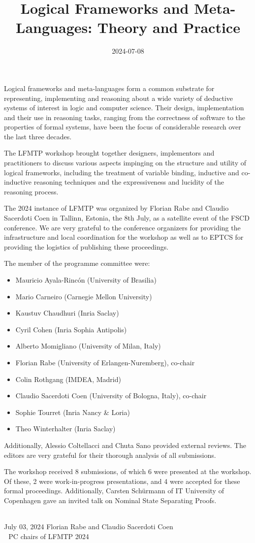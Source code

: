 \documentclass{article}
\begin{document}
\title{Logical Frameworks and Meta-Languages: Theory and Practice}
\date{2024-07-08}
\maketitle

Logical frameworks and meta-languages form a common substrate for
representing, implementing and reasoning about a wide variety of
deductive systems of interest in logic and computer science. Their
design, implementation and their use in reasoning tasks, ranging from
the correctness of software to the properties of formal systems,
have been the focus of considerable research over the last three decades.

The LFMTP workshop brought together designers, implementors and
practitioners to discuss various aspects impinging on the structure and
utility of logical frameworks, including the treatment of variable
binding, inductive and co-inductive reasoning techniques and the
expressiveness and lucidity of the reasoning process.

The 2024 instance of LFMTP was organized by Florian Rabe and Claudio Sacerdoti Coen in Tallinn, Estonia, the 8th July, as a satellite event of the FSCD conference. We are very grateful to the conference organizers for providing the infrastructure and local coordination for the workshop as well as to EPTCS for providing the logistics of publishing these proceedings.

The member of the programme committee were:
\begin{itemize}
\item Mauricio Ayala-Rincón (University of Brasilia)
\item Mario Carneiro (Carnegie Mellon University)
\item Kaustuv Chaudhuri (Inria Saclay)
\item Cyril Cohen (Inria Sophia Antipolis)
\item Alberto Momigliano (University of Milan, Italy)
\item Florian Rabe (University of Erlangen-Nuremberg), co-chair
\item Colin Rothgang (IMDEA, Madrid)
\item Claudio Sacerdoti Coen (University of Bologna, Italy), co-chair
\item Sophie Tourret (Inria Nancy \& Loria)
\item Theo Winterhalter (Inria Saclay)
\end{itemize}
Additionally, Alessio Coltellacci and Chuta Sano provided external reviews.
The editors are very grateful for their thorough analysis of all submissions.

The workshop received 8 submissions, of which 6 were presented at the workshop.
Of these, 2 were work-in-progress presentations, and 4 were accepted for these formal proceedings.
Additionally, Carsten Sch\"urmann of IT University of Copenhagen gave an invited talk on Nominal State Separating Proofs.

~\\

\noindent
July 03, 2024 \hfill Florian Rabe and Claudio Sacerdoti Coen\\
              \mbox{~\,}\hfill PC chairs of LFMTP 2024
\end{document}
